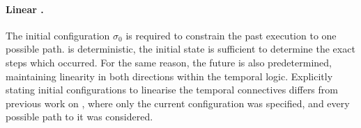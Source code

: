 \paragraph{Linear \Chainmail.}
The initial configuration $\sigma_0$ is required to constrain the past execution to one possible path. 
is deterministic, the initial state is sufficient to determine the exact steps which occurred. For the same reason, the future is also predetermined, maintaining linearity in both directions within the temporal logic. 
Explicitly stating initial configurations to linearise the temporal connectives differs from previous work on \Chainmail\cite{FASE}, where only the current configuration was specified, and every possible path to it was considered.

 



